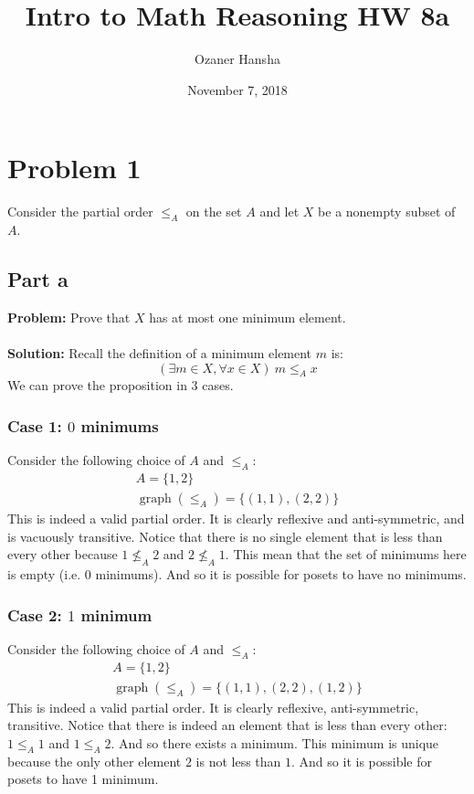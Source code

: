 \documentclass{article}
\begin{document}
\title{Intro to Math Reasoning HW 8a}
\author{Ozaner Hansha}
\date{November 7, 2018}
\maketitle

\section*{Problem 1}
Consider the partial order $\le_A$ on the set $A$ and let $X$ be a nonempty subset of $A$.
\subsection*{Part a}
\textbf{Problem:} Prove that $X$ has at most one minimum element.
\\\\
\textbf{Solution:} Recall the definition of a minimum element $m$ is:
$$(\exists m\in X,\forall x\in X)\ m\le_Ax$$
We can prove the proposition in 3 cases.

\subsubsection*{Case 1: $0$ minimums}
Consider the following choice of $A$ and $\le_A$:
\begin{gather*}
  A=\{1,2\}\\
  \operatorname{graph}(\le_A)=\{(1,1),(2,2)\}
\end{gather*}
This is indeed a valid partial order. It is clearly reflexive and anti-symmetric, and is vacuously transitive. Notice that there is no single element that is less than every other because $1\not\le_A 2$ and $2\not\le_A 1$. This mean that the set of minimums here is empty (i.e. 0 minimums). And so it is possible for posets to have no minimums.

\subsubsection*{Case 2: $1$ minimum}
Consider the following choice of $A$ and $\le_A$:
\begin{gather*}
  A=\{1,2\}\\
  \operatorname{graph}(\le_A)=\{(1,1),(2,2),(1,2)\}
\end{gather*}
This is indeed a valid partial order. It is clearly reflexive, anti-symmetric, transitive. Notice that there is indeed an element that is less than every other: $1\le_A 1$ and $1\le_A 2$. And so there exists a minimum. This minimum is unique because the only other element $2$ is not less than $1$. And so it is possible for posets to have 1 minimum.
\end{document}
